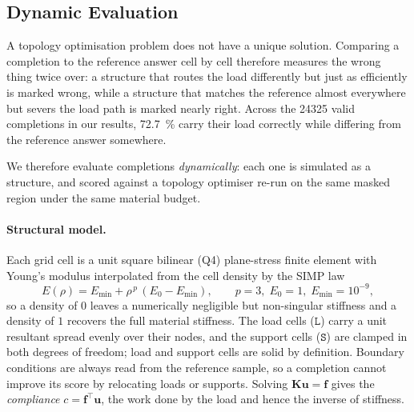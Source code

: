 
\subsection{Dynamic Evaluation}
\label{sec:dynamic-evaluation}

A topology optimisation problem does not have a unique solution. Comparing a
completion to the reference answer cell by cell therefore measures the wrong
thing twice over: a structure that routes the load differently but just as
efficiently is marked wrong, while a structure that matches the reference almost
everywhere but severs the load path is marked nearly right. Across the
\num{24325} valid completions in our results, \SI{72.7}{\percent} carry their
load correctly while differing from the reference answer somewhere.

We therefore evaluate completions \emph{dynamically}: each one is simulated as a
structure, and scored against a topology optimiser re-run on the same masked
region under the same material budget.

\paragraph{Structural model.}
Each grid cell is a unit square bilinear (Q4) plane-stress finite element with
Young's modulus interpolated from the cell density by the SIMP law
\begin{equation}
  E(\rho) = E_{\min} + \rho^{\,p}\,(E_0 - E_{\min}),
  \qquad p = 3,\; E_0 = 1,\; E_{\min} = 10^{-9},
  \label{eq:simp}
\end{equation}
so a density of $0$ leaves a numerically negligible but non-singular stiffness
and a density of $1$ recovers the full material stiffness. The load cells
($\mathtt{L}$) carry a unit resultant spread evenly over their nodes, and the
support cells ($\mathtt{S}$) are clamped in both degrees of freedom; load and
support cells are solid by definition. Boundary conditions are always read from
the reference sample, so a completion cannot improve its score by relocating
loads or supports. Solving $\mathbf{K}\mathbf{u} = \mathbf{f}$ gives the
\emph{compliance} $c = \mathbf{f}^{\!\top}\mathbf{u}$, the work done by the load
and hence the inverse of stiffness.

